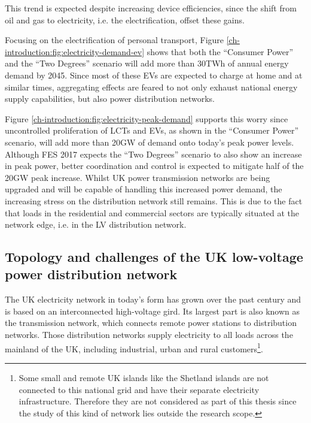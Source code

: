 This trend is expected despite increasing device efficiencies, since the shift from oil and gas to electricity, i.e. the electrification, offset these gains.



Focusing on the electrification of personal transport, Figure \ref{ch-introduction:fig:electricity-demand-ev} shows that both the ``Consumer Power'' and the ``Two Degrees'' scenario will add more than 30TWh of annual energy demand by 2045.
Since most of these EVs are expected to charge at home and at similar times, aggregating effects are feared to not only exhaust national energy supply capabilities, but also power distribution networks.




Figure \ref{ch-introduction:fig:electricity-peak-demand} supports this worry since uncontrolled proliferation of LCTs and EVs, as shown in the ``Consumer Power'' scenario, will add more than 20GW of demand onto today's peak power levels.
Although FES 2017 expects the ``Two Degrees'' scenario to also show an increase in peak power, better coordination and control is expected to mitigate half of the 20GW peak increase.
Whilst UK power transmission networks are being upgraded and will be capable of handling this increased power demand, the increasing stress on the distribution network still remains.
This is due to the fact that loads in the residential and commercial sectors are typically situated at the network edge, i.e. in the LV distribution network.

\subsection{Topology and challenges of the UK low-voltage power distribution network}
\label{ch-introduction:subsec:topology-of-lv-network}

The UK electricity network in today's form has grown over the past century and is based on an interconnected high-voltage gird.
Its largest part is also known as the transmission network, which connects remote power stations to distribution networks.
Those distribution networks supply electricity to all loads across the mainland of the UK, including industrial, urban and rural customers\footnote[1]{Some small and remote UK islands like the Shetland islands are not connected to this national grid and have their separate electricity infrastructure. Therefore they are not considered as part of this thesis since the study of this kind of network lies outside the research scope.}.

